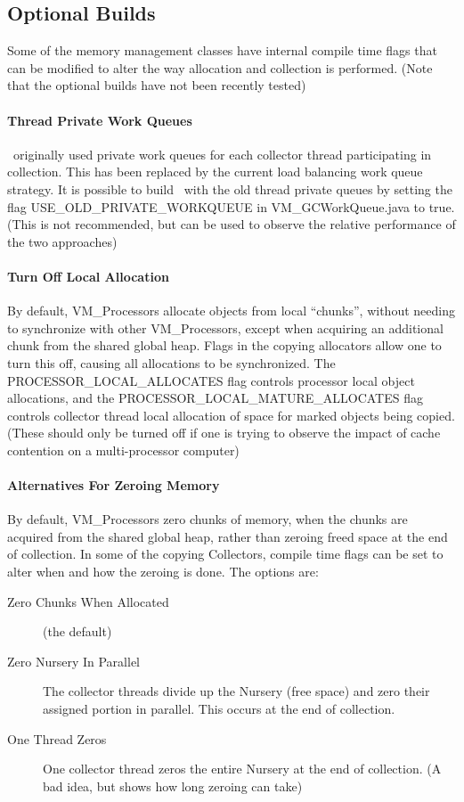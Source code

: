 \subsection{Optional Builds} \label{ssses:optionalbuilds}
Some of the memory management classes have internal compile
time flags that can be modified to alter the way allocation 
and collection is performed.
(Note that the optional builds have not been recently tested)

\paragraph{Thread Private Work Queues}
\jp\ originally used private work queues for each collector thread
participating in collection.  This has been replaced by the current
load balancing work queue strategy.  It is possible to build \jp\
with the old thread private queues by setting the flag
USE\_OLD\_PRIVATE\_WORKQUEUE in VM\_GCWorkQueue.java to true.
(This is not recommended, but can be used to observe the relative
performance of the two approaches)

\paragraph{Turn Off Local Allocation} 
By default, VM\_Processors allocate objects from local ``chunks'', without
needing to synchronize with other VM\_Processors, except when acquiring
an additional chunk from the shared global heap.  Flags in the
copying allocators allow one to turn this off, causing all allocations
to be synchronized. 
The PROCESSOR\_LOCAL\_ALLOCATES flag controls processor local object
allocations, and the PROCESSOR\_LOCAL\_MATURE\_ALLOCATES flag controls
collector thread local allocation of space for marked objects being
copied. (These should only be turned off if one is trying to observe
the impact of cache contention on a multi-processor computer)

\paragraph{Alternatives For Zeroing Memory}
By default, VM\_Processors zero chunks of memory, when the chunks are
acquired from the shared global heap, rather than zeroing freed
space at the end of collection.  In some of the copying Collectors,
compile time flags can be set to alter when and how the zeroing is
done.  The options are:
\begin{description}
\item[Zero Chunks When Allocated] (the default)
\item[Zero Nursery In Parallel] The collector threads divide up the
Nursery (free space) and zero their assigned portion in parallel.
This occurs at the end of collection.
\item[One Thread Zeros] One collector thread zeros the entire Nursery
at the end of collection. (A bad idea, but shows how long zeroing can take)
\end{description}



